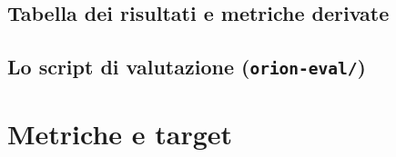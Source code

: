 %

\subsection{Tabella dei risultati e metriche derivate}
\label{subsec:eval-results-table}

\subsection{Lo script di valutazione (\texttt{orion-eval/})}
\label{subsec:eval-script}
%

\section{Metriche e target}
\label{sec:eval-metriche}
%
%

